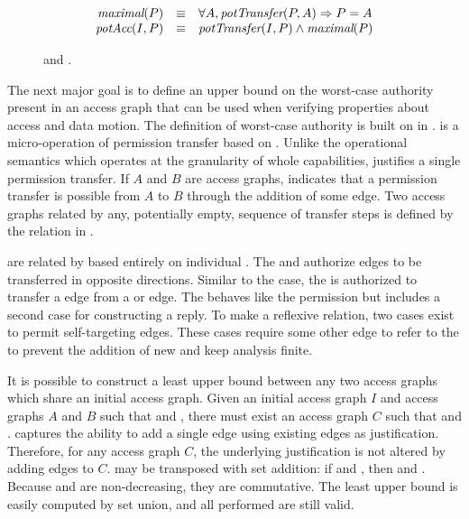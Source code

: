 \begin{figure}
  \[
  \begin{array}{rcl}
      \textit{maximal}(P) & \equiv & \forall A, \textit{potTransfer}(P,A) \Rightarrow P = A \\
      \textit{potAcc}(I,P) & \equiv & \textit{potTransfer}(I,P) \wedge \textit{maximal}(P)
  \end{array}
  \]
  \caption{\xmakefirstuc{\TMmaximal{}} and \TMpotAcc{} \label{fig:sketch:maximal}. \label{fig:sketch:potAcc}}
\end{figure}

The next major goal is to define an upper bound on the worst-case authority present in an access graph that can be used when verifying properties about access and data motion.
The definition of worst-case authority is built on \term{\TMtransfer{}} in .
\Term{\TMtransfer} is a micro-operation of permission transfer based on \TMaccessGraphs{}.
Unlike the operational semantics which operates at the granularity of whole capabilities, \TMtransfer{} justifies a single permission transfer.
If \(A\) and \(B\) are access graphs,  indicates that a permission transfer is possible from \(A\) to \(B\) through the addition of some edge.
Two access graphs related by any, potentially empty, sequence of transfer steps is defined by the \term{\TMpotTransfer} relation \NMpotTransfer{} in .

\xmakefirstuc{\TMaccessGraphs} are related by \NMtransfer{} based entirely on individual \TMaccessRights{}.
The \NMrd{} and \NMwr{} \TMaccessRight{} authorize edges to be transferred in opposite directions.
Similar to the \NMrd{} case, the \NMwk{} \TMaccessRight{} is authorized to transfer a \NMwk{} edge from a \NMwk{} or \NMrd{} edge.
The \NMtx{} \TMaccessRight{} behaves like the \NMwr{} permission but includes a second case for constructing a reply.
To make \NMtransfer{} a reflexive relation, two cases exist to permit self-targeting edges.
These cases require some other edge to refer to the \TMobjs{} to prevent the addition of new \TMrefs{} and keep analysis finite.

It is possible to construct a least upper bound between any two access graphs which share an initial access graph.
Given an initial access graph \(I\) and access graphs \(A\) and \(B\) such that  and , there must exist an access graph \(C\) such that  and .
\xmakefirstuc{\TMtransfer{}} captures the ability to add a single edge using existing edges as justification.
Therefore, for any access graph \(C\), the underlying justification is not altered by adding edges to \(C\).
\xmakefirstuc{\TMtransfer{}} may be transposed with set addition: if  and , then  and .
Because \NMtransfer{} and \NMpotTransfer{} are non-decreasing, they are commutative.
The least upper bound is easily computed by set union, and all \TMtransfers{} performed are still valid.

